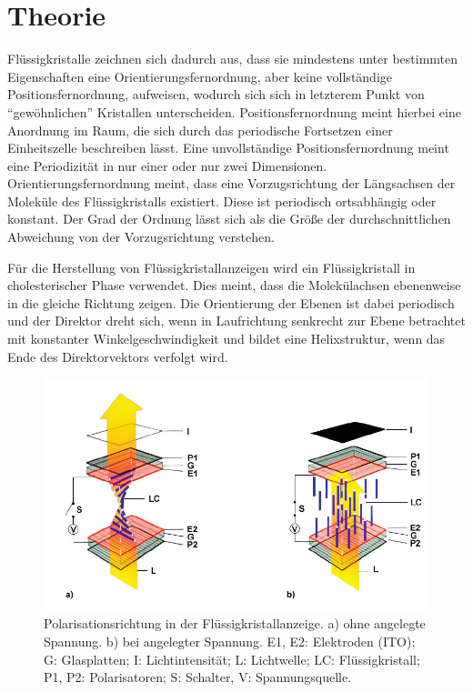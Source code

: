 \documentclass[
	a4paper,
	12pt,
	pagesize,
	ngerman
]{scrartcl}
\begin{document}
	\section{Theorie}
	Flüssigkristalle zeichnen sich dadurch aus, dass sie mindestens unter bestimmten Eigenschaften eine Orientierungsfernordnung, aber keine vollständige Positionsfernordnung, aufweisen, wodurch sich sich in letzterem Punkt von \enquote{gewöhnlichen} Kristallen unterscheiden.
	Positionsfernordnung meint hierbei eine Anordnung im Raum, die sich durch das periodische Fortsetzen einer Einheitszelle beschreiben lässt.
	Eine unvollständige Positionsfernordnung meint eine Periodizität in nur einer oder nur zwei Dimensionen.
	Orientierungsfernordnung meint, dass eine Vorzugsrichtung der Längsachsen der Moleküle des Flüssigkristalls existiert.
	Diese ist periodisch ortsabhängig oder konstant.
	Der Grad der Ordnung lässt sich als die Größe der durchschnittlichen Abweichung von der Vorzugsrichtung verstehen.

	Für die Herstellung von Flüssigkristallanzeigen wird ein Flüssigkristall in cholesterischer Phase verwendet.
	Dies meint, dass die Molekülachsen ebenenweise in die gleiche Richtung zeigen.
	Die Orientierung der Ebenen ist dabei periodisch und der Direktor dreht sich, wenn in Laufrichtung senkrecht zur Ebene betrachtet mit konstanter Winkelgeschwindigkeit und bildet eine Helixstruktur, wenn das Ende des Direktorvektors verfolgt wird.
	\begin{figure}[H]
			\includegraphics[width=1\linewidth]{images/displayHelix}
			\caption{
			Polarisationsrichtung in der Flüssigkristallanzeige. a) ohne angelegte Spannung. b) bei angelegter Spannung. E1, E2: Elektroden (ITO); G: Glasplatten; I: Lichtintensität; L: Lichtwelle; LC: Flüssigkristall;
P1, P2: Polarisatoren; S: Schalter, V: Spannungsquelle. \cite{displayHelix}
			}
			\label{fig_displayHelixBild}
	\end{figure}
\end{document}
